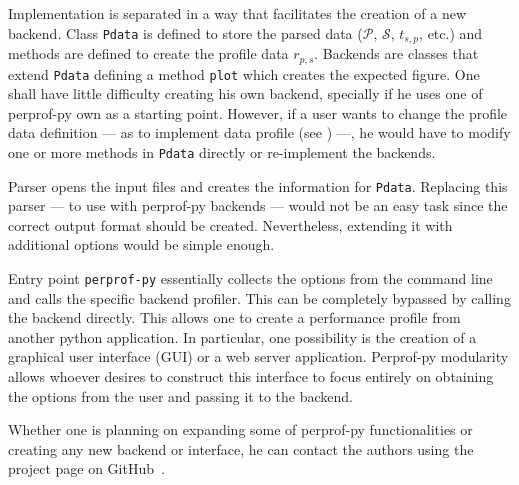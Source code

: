 Implementation is separated in a way that facilitates the creation of a
new backend.
Class {\tt Pdata} is defined to store the parsed data ($\mathcal{P}$,
$\mathcal{S}$, $t_{s,p}$, etc.) and  methods are defined to create the profile data
$r_{p,s}$.
Backends are classes that extend {\tt Pdata} defining a method {\tt plot}
which creates the expected figure.
One shall have little difficulty creating his own backend, specially if he
uses one of perprof-py own as a starting point.
However, if a user wants to change the profile data definition --- as
to implement  data profile (see \cite{bib:more2009benchmarking}) ---, he would have to modify
one or more methods in {\tt Pdata} directly or re-implement the backends.

Parser opens the input files and creates the information for {\tt Pdata}.
Replacing this parser --- to use with perprof-py backends --- would not be an easy task
since the correct output format should be created.  Nevertheless,
extending it with additional options would be simple enough.

Entry point {\tt perprof-py} essentially collects the options from the command
line and calls the specific backend profiler. This can be completely bypassed
by calling the backend directly. This allows one to create a performance
profile from another python application. In particular, one possibility is the
creation of a graphical user interface (GUI)
or a web server application. Perprof-py modularity 
allows whoever desires to construct this interface to focus entirely on
obtaining the options from the user and passing it to the backend.

Whether one is planning on expanding some of perprof-py functionalities or creating any
new backend or interface, he can contact the authors using the project page on
GitHub~\cite{url:perprof-py}.

